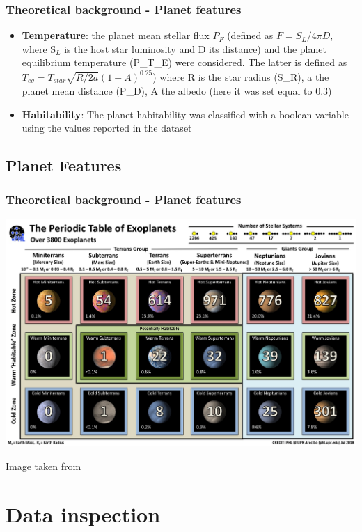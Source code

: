 \documentclass[compress]{beamer}
\begin{document}
\begin{frame}
\frametitle{Theoretical background - Planet features }
\begin{itemize}
\item\textbf{Temperature}: the planet mean stellar flux $P_F$ (defined as $F=S_{L}/4\pi D$, where S$_{L}$ is the host star luminosity and D its distance) and the planet equilibrium temperature (P\_T\_E) were considered. The latter is defined as $T_{eq}=T_{star}\sqrt{R/2a}\left(1-A\right)^{0.25}$) where R is the star radius (S\_R), a the planet mean distance (P\_D), A the albedo (here it was set equal to 0.3)
\item\textbf{Habitability}: The planet habitability was classified with a boolean variable using the values reported in the dataset \cite{planet_dataset}
\end{itemize}
\end{frame}

\subsection{Planet Features}

\begin{frame}
\frametitle{Theoretical background - Planet features }
\begin{center}
\includegraphics[width=.9\linewidth,]{Pic/PT_Confirmed.jpg}
\end{center}
\begin{center}
Image taken from \cite{exoplanets-catalog}
\end{center}
\end{frame}


\section{Data inspection}
\end{document}
